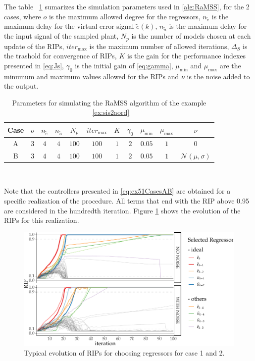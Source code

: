 \begin{exmp}
The table ~\ref{tab:exp51_param} sumarizes the simulation parameters used in \ref{alg:RaMSS}, for the 2 cases,
where $o$ is the maximum allowed degree for the regressors, $n_{\tilde{e}}$ is the maximum delay for the virtual error signal $\tilde{e}(k)$, $n_{\tilde{u}}$ is the maximum delay for the input signal of the sampled plant, $ N_p$ is the number of models chosen at each update of the RIPs, $ iter_{\max} $ is the maximum number of allowed iterations, $\Delta_S$ is the trashold for convergence of RIPs, $K$ is the gain for the performance indexes presented in \ref{eq:Js}, $\gamma_0$ is the initial gain of \ref{eq:gamma}, $\mu_{\min}$ and $\mu_{\max}$ are the minumum and maximum values allowed for the RIPs and $\nu$ is the noise added to the output.
\begin{table}[htpb]
  \centering
  \caption{Parameters for simulating the RaMSS algorithm of the example ~\ref{ex:sis2aord}}\label{tab:exp51_param}
  \begin{tabular}{c|c|c|c|c|c|c|c|c|c|c}
    Case & $o$ & $n_{\tilde{e}}$ & $n_{\tilde{u}}$ & $ N_p$ & $ iter_{\max} $ & $K$ & $\gamma_0$ &  $\mu_{\min}$ & $\mu_{\max}$ & $\nu$\\
    \hline
    A & $ 3 $ & $4$ & $4$ & $100$ & $100$ & $1$ & $2$ & $0.05$ & $1$ & $0$ \\
    B & $ 3 $ & $4$ & $4$ & $100$ & $100$ & $1$ & $2$ & $0.05$ & $1$ & $\mathcal{N}(\mu,\sigma)$
  \end{tabular}
\end{table}\\

Note that the controllers presented in \eqref{eq:ex51CasesAB} are obtained for a specific realization of the procedure. All terms that end with the RIP above 0.95 are considered in the hundredth iteration.
Figure \ref{fig:ex51_RIPevol_2cases} shows the evolution of the RIPs for this realization.

\begin{figure}[H]
  \centering
  \includegraphics[width=\textwidth]{Figs/Cap5/ex51_rips.tex.pdf}
  \caption{Typical evolution of RIPs for choosing regressors for case 1 and 2.}
  \label{fig:ex51_RIPevol_2cases}
\end{figure}


\end{exmp}
